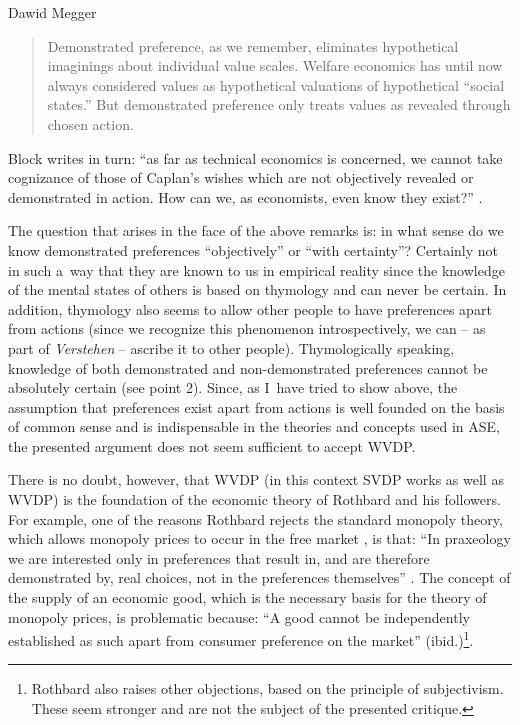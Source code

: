 \begin{artengenv}{Dawid Megger}
\begin{quote}
Demonstrated preference, as we remember, eliminates hypothetical imaginings about individual value scales. Welfare economics has until now always considered values as hypothetical valuations of hypothetical ``social states.'' But demonstrated preference only treats values as revealed through chosen action. 
\parencite[][p.320]{rothbard_present_2011}%
\end{quote}




Block writes in turn: ``as far as technical economics is concerned, we cannot take cognizance of those of Caplan's wishes which are not objectively revealed or demonstrated in action. How can we, as economists, even know they exist?'' 
\parencite[][p.23]{block_austrian_1999}.%




The question that arises in the face of the above remarks is: in what sense do we know demonstrated preferences ``objectively'' or ``with certainty''? Certainly not in such a~way that they are known to us in empirical reality since the knowledge of the mental states of others is based on thymology and can never be certain. In addition, thymology also seems to allow other people to have preferences apart from actions (since we recognize this phenomenon introspectively, we can -- as part of \textit{Verstehen} -- ascribe it to other people). Thymologically speaking, knowledge of both demonstrated and non-demonstrated preferences cannot be absolutely certain (see point 2). Since, as I~have tried to show above, the assumption that preferences exist apart from actions is well founded on the basis of common sense and is indispensable in the theories and concepts used in ASE, the presented argument does not seem sufficient to accept WVDP.



There is no doubt, however, that WVDP (in this context SVDP works as well as WVDP) is the foundation of the economic theory of Rothbard and his followers. For example, one of the reasons Rothbard rejects the standard monopoly theory, which allows monopoly prices to occur in the free market 
\parencite[whichsee:][]{mises_human_1998}, %
 is that: ``In praxeology we are interested only in preferences that result in, and are therefore demonstrated by, real choices, not in the preferences themselves'' 
\parencite[][p.701]{rothbard_man_2009}. %
 The concept of the supply of an economic good, which is the necessary basis for the theory of monopoly prices, is problematic because: ``A good cannot be independently established as such apart from consumer preference on the market'' (ibid.)\footnote{Rothbard also raises other objections, based on the principle of subjectivism. These seem stronger and are not the subject of the presented critique.}.




\end{artengenv}
